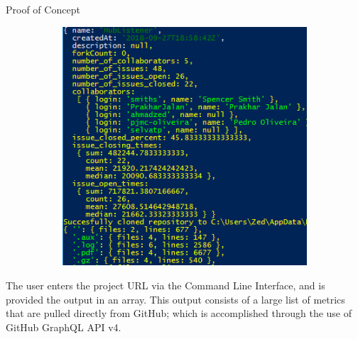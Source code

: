 \documentclass[22pt]{beamer}
\begin{document}
\begin{frame}[fragile]
\begin{textblock}{7.25}
\begin{block}{Proof of Concept}
\begin{figure}
  \begin{subfigure}{0.96\textwidth}
    \centering
     \includegraphics[width=36cm]{PowerShellPOC_p2.png} 
  \end{subfigure}
\end{figure}
The user enters the project URL via the Command Line Interface, and is provided the output in an array. This output consists of a large list of metrics that are pulled directly from GitHub; which is accomplished through the use of GitHub GraphQL API v4.

\end{block}

\end{textblock}


\end{frame}
\end{document}
